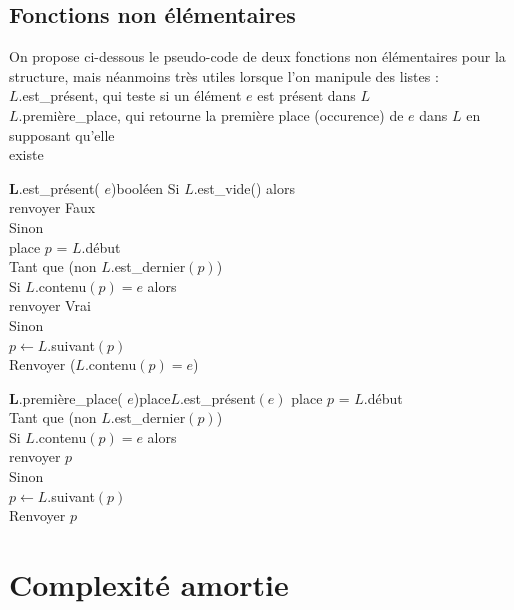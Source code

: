 	\subsection{Fonctions non élémentaires}
		
		On propose ci-dessous le pseudo-code de deux fonctions non élémentaires pour la structure, mais néanmoins très utiles lorsque l'on manipule des listes : \\
			 \bdot \textsf{\(L.\)est\_présent}, qui teste si un élément \(e\) est présent dans \(L\) \\
			 \bdot \textsf{\(L.\)première\_place}, qui retourne la première place (occurence) de \(e\) dans \(L\) en supposant qu'elle \\ \listskip existe
			
		\begin{pscode}{\(\bm{L.}\)est\_présent}{( \(e\))}{booléen}{}
			Si \(L.\)\textsf{est\_vide}() alors \\ \Indp
				renvoyer Faux \\ \Indm
			Sinon \\ \Indp
				place \(p\) = \(L.\)\textsf{début} \\
				Tant que (non \(L.\)\textsf{est\_dernier}\((p)\)) \\ \Indp
					Si \(L.\)\textsf{contenu}\((p) = e\) alors \\ \Indp
						renvoyer Vrai \\ \Indm
					Sinon \\ \Indp
						\(p \gets L.\)\textsf{suivant}\((p)\) \\ \Indm \Indm
				Renvoyer (\(L.\)\textsf{contenu}\((p) = e\))
		\end{pscode}
		
		\begin{pscode}{\(\bm{L.}\)première\_place}{( \(e\))}{place}{\(L.\)\textsf{est\_présent}$(e)$}
			place \(p\) = \(L.\)\textsf{début} \\
			Tant que (non \(L.\)\textsf{est\_dernier}\((p)\)) \\ \Indp
				Si \(L.\)\textsf{contenu}\((p) = e\) alors \\ \Indp
					renvoyer \(p\) \\ \Indm
				Sinon \\ \Indp
				\(p \gets L.\)\textsf{suivant}\((p)\) \\ \Indm \Indm
			Renvoyer \(p\)
		\end{pscode}
	
\section{Complexité amortie}

